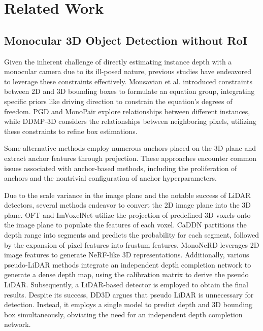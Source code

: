 \documentclass[journal]{IEEEtran}
\begin{document}
	\section{Related Work}
	\subsection{Monocular 3D Object Detection without RoI}
	Given the inherent challenge of directly estimating instance depth with a monocular camera due to its ill-posed nature, previous studies have endeavored to leverage these constraints effectively. Mousavian et al. \cite{geometry3d} introduced constraints between 2D and 3D bounding boxes to formulate an equation group, integrating specific priors like driving direction to constrain the equation's degrees of freedom. PGD \cite{pgd} and MonoPair \cite{monopair} explore relationships between different instances, while DDMP-3D \cite{ddmp-3d} considers the relationships between neighboring pixels, utilizing these constraints to refine box estimations.
	
	Some alternative methods \cite{m3d-rpn, d4lcn, monodtr} employ numerous anchors placed on the 3D plane and extract anchor features through projection. These approaches encounter common issues associated with anchor-based methods, including the proliferation of anchors and the nontrivial configuration of anchor hyperparameters.
	
	Due to the scale variance in the image plane and the notable success of LiDAR detectors, several methods endeavor to convert the 2D image plane into the 3D plane. OFT \cite{oft} and ImVoxelNet \cite{imvoxelnet} utilize the projection of predefined 3D voxels onto the image plane to populate the features of each voxel. CaDDN \cite{caddn} partitions the depth range into segments and predicts the probability for each segment, followed by the expansion of pixel features into frustum features. MonoNeRD \cite{mononerd} leverages 2D image features to generate NeRF-like 3D representations. Additionally, various pseudo-LiDAR methods \cite{color-embeded, mono-plidar, patchnet} integrate an independent depth completion network to generate a dense depth map, using the calibration matrix to derive the pseudo LiDAR. Subsequently, a LiDAR-based detector is employed to obtain the final results. Despite its success, DD3D \cite{dd3d} argues that pseudo LiDAR is unnecessary for detection. Instead, it employs a single model to predict depth and 3D bounding box simultaneously, obviating the need for an independent depth completion network.
	
\end{document}
